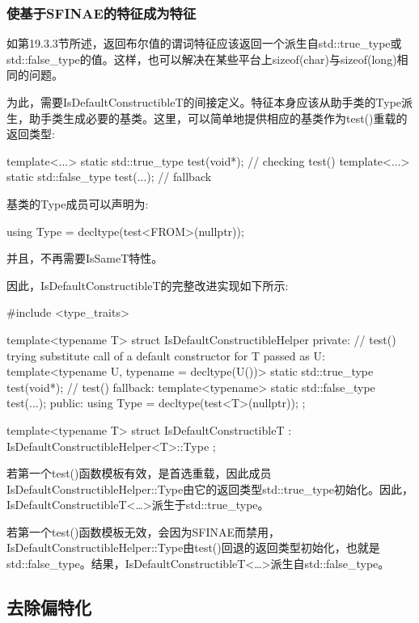 \subsubsection{使基于SFINAE的特征成为特征}

如第19.3.3节所述，返回布尔值的谓词特征应该返回一个派生自std::true\_type或std::false\_type的值。这样，也可以解决在某些平台上sizeof(char)与sizeof(long)相同的问题。

为此，需要IsDefaultConstructibleT的间接定义。特征本身应该从助手类的Type派生，助手类生成必要的基类。这里，可以简单地提供相应的基类作为test()重载的返回类型:

\begin{cpp}
template<...> static std::true_type test(void*); // checking test()
template<...> static std::false_type test(...); // fallback
\end{cpp}

基类的Type成员可以声明为:

\begin{cpp}
using Type = decltype(test<FROM>(nullptr));
\end{cpp}

并且，不再需要IsSameT特性。

因此，IsDefaultConstructibleT的完整改进实现如下所示:

\begin{cpp}
#include <type_traits>

template<typename T>
struct IsDefaultConstructibleHelper {
	private:
	// test() trying substitute call of a default constructor for T passed as U:
	template<typename U, typename = decltype(U())>
		static std::true_type test(void*);
	// test() fallback:
	template<typename>
		static std::false_type test(...);
	public:
	using Type = decltype(test<T>(nullptr));
};

template<typename T>
struct IsDefaultConstructibleT : IsDefaultConstructibleHelper<T>::Type {
};
\end{cpp}

若第一个test()函数模板有效，是首选重载，因此成员IsDefaultConstructibleHelper::Type由它的返回类型std::true\_type初始化。因此，IsDefaultConstructibleT<…>派生于std::true\_type。

若第一个test()函数模板无效，会因为SFINAE而禁用，IsDefaultConstructibleHelper::Type由test()回退的返回类型初始化，也就是std::false\_type。结果，IsDefaultConstructibleT<…>派生自std::false\_type。

\subsection{去除偏特化}

